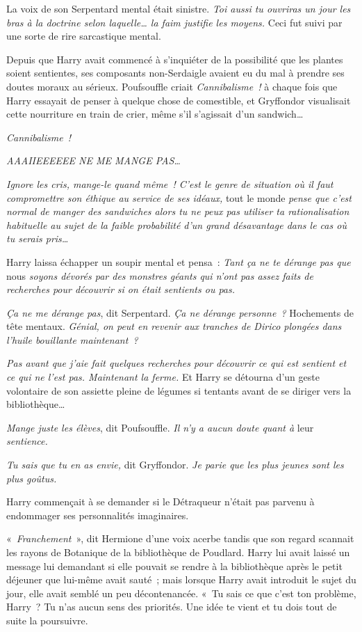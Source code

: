La voix de son Serpentard mental était sinistre. \emph{Toi aussi tu ouvriras un jour les bras à la doctrine selon laquelle… la faim justifie les moyens.} Ceci fut suivi par une sorte de rire sarcastique mental.

Depuis que Harry avait commencé à s'inquiéter de la possibilité que les plantes soient sentientes, ses composants non-Serdaigle avaient eu du mal à prendre ses doutes moraux au sérieux. Poufsouffle criait \emph{Cannibalisme~!} à chaque fois que Harry essayait de penser à quelque chose de comestible, et Gryffondor visualisait cette nourriture en train de crier, même s'il s'agissait d'un sandwich…

\emph{Cannibalisme~!}

\emph{AAAIIEEEEEE NE ME MANGE PAS…}

\emph{Ignore les cris, mange-le quand même~! C'est le genre de situation où il faut compromettre son éthique au service de ses idéaux,} tout le monde \emph{pense que c'est normal de manger des sandwiches alors tu ne peux pas utiliser ta rationalisation habituelle au sujet de la faible probabilité d'un grand désavantage dans le cas où tu serais pris…}

Harry laissa échapper un soupir mental et pensa~: \emph{Tant ça ne te dérange pas que} nous \emph{soyons dévorés par des monstres géants qui n'ont pas assez faits de recherches pour découvrir si on était sentients ou pas.}

\emph{Ça ne me dérange pas}, dit Serpentard. \emph{Ça ne dérange personne~?} Hochements de tête mentaux. \emph{Génial, on peut en revenir aux tranches de Dirico plongées dans l'huile bouillante maintenant~?}

\emph{Pas avant que j'aie fait quelques recherches pour découvrir ce qui est sentient et ce qui ne l'est pas. Maintenant la ferme.} Et Harry se détourna d'un geste volontaire de son assiette pleine de légumes si tentants avant de se diriger vers la bibliothèque…

\emph{Mange juste les élèves}, dit Poufsouffle. \emph{Il n'y a aucun doute quant à} leur \emph{sentience.}

\emph{Tu sais que tu en as envie,} dit Gryffondor. \emph{Je parie que les plus jeunes sont les plus goûtus.}

Harry commençait à se demander si le Détraqueur n'était pas parvenu à endommager ses personnalités imaginaires.

\later

«~\emph{Franchement}~», dit Hermione d'une voix acerbe tandis que son regard scannait les rayons de Botanique de la bibliothèque de Poudlard. Harry lui avait laissé un message lui demandant si elle pouvait se rendre à la bibliothèque après le petit déjeuner que lui-même avait sauté~; mais lorsque Harry avait introduit le sujet du jour, elle avait semblé un peu décontenancée. «~Tu sais ce que c'est ton problème, Harry~? Tu n'as aucun sens des priorités. Une idée te vient et tu dois tout de suite la poursuivre.

